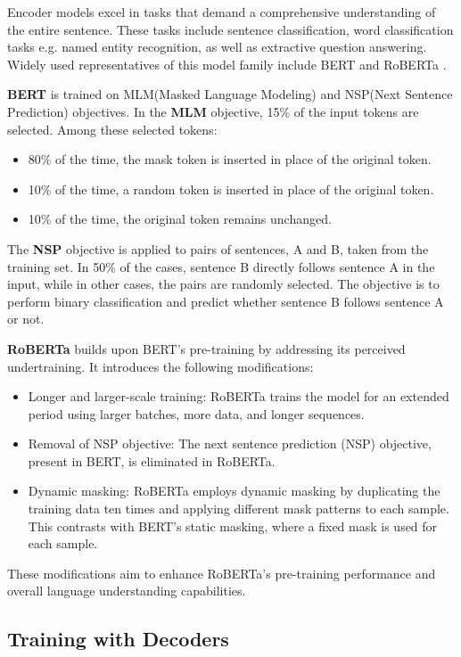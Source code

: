 Encoder models excel in tasks that demand a comprehensive understanding of the entire sentence. These tasks include sentence classification, word classification tasks e.g. named entity recognition, as well as extractive question answering. Widely used representatives of this model family include BERT \cite{devlin2018bert} and RoBERTa \cite{liu2019roberta}.

\textbf{BERT} \cite{devlin2018bert} is trained on MLM(Masked Language Modeling) and NSP(Next Sentence Prediction) objectives.
In the \textbf{MLM} objective, 15\% of the input tokens are selected. Among these selected tokens:
\begin{itemize}
    \item 80\% of the time, the mask token is inserted in place of the original token.
    \item 10\% of the time, a random token is inserted in place of the original token.
    \item 10\% of the time, the original token remains unchanged.
\end{itemize}
The \textbf{NSP} objective is applied to pairs of sentences, A and B, taken from the training set. In 50\% of the cases, sentence B directly follows sentence A in the input, while in other cases, the pairs are randomly selected. The objective is to perform binary classification and predict whether sentence B follows sentence A or not.

\textbf{RoBERTa} \cite{liu2019roberta} builds upon BERT's pre-training by addressing its perceived undertraining. It introduces the following modifications:
\begin{itemize}
    \item Longer and larger-scale training: RoBERTa trains the model for an extended period using larger batches, more data, and longer sequences.
    \item Removal of NSP objective: The next sentence prediction (NSP) objective, present in BERT, is eliminated in RoBERTa.
    \item Dynamic masking: RoBERTa employs dynamic masking by duplicating the training data ten times and applying different mask patterns to each sample. This contrasts with BERT's static masking, where a fixed mask is used for each sample.
\end{itemize}
These modifications aim to enhance RoBERTa's pre-training performance and overall language understanding capabilities.




\subsection{Training with Decoders}
